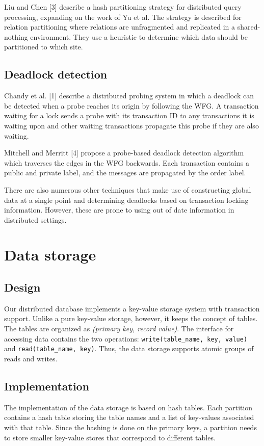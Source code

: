 \documentclass[a4paper, 10pt, notitlepage]{article}
\begin{document}
Liu and Chen [3] describe a hash partitioning strategy for distributed query processing, expanding on the work of Yu et al. The strategy is described for relation partitioning where relations are unfragmented and replicated in a shared-nothing environment. They use a heuristic to determine which data should be partitioned to which site.

\subsection{Deadlock detection}
Chandy et al. [1] describe a distributed probing system in which a deadlock can be detected when a probe reaches its origin by following the WFG. A transaction waiting for a lock sends a probe with its transaction ID to any transactions it is waiting upon and other waiting transactions propagate this probe if they are also waiting.

Mitchell and Merritt [4] propose a probe-based deadlock detection algorithm which traverses the edges in the WFG backwards. Each transaction contains a public and private label, and the messages are propagated by the order label.

There are also numerous other techniques that make use of constructing global data at a single point and determining deadlocks based on transaction locking information. However, these are prone to using out of date information in distributed settings.


\section{Data storage}

\subsection{Design}
Our distributed database implements a key-value storage system with transaction support. Unlike a pure key-value storage, however,
it keeps the concept of tables. The tables are organized as {\em (primary key, record value)}.
The interface for accessing data contains the two operations: \texttt{write(table\_name, key, value)} and \texttt{read(table\_name, key)}.
Thus, the data storage supports atomic groups of reads and writes.

\subsection{Implementation}
The implementation of the data storage is based on hash tables. Each partition contains a hash table storing the table names and a list
of key-values associated with that table. Since the hashing is done on the primary keys, a partition needs to store smaller key-value
stores that correspond to different tables. 
\end{document}
